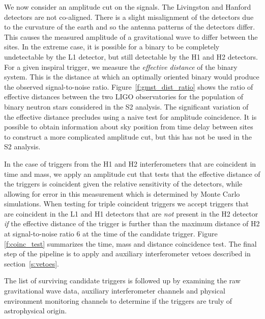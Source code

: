 We now consider an amplitude cut on the signals. The Livingston and Hanford
detectors are not co-aligned. There is a slight misalignment of the detectors
due to the curvature of the earth and so the antenna patterns of the detectors
differ. This causes the measured amplitude of a gravitational wave to differ
between the sites. In the extreme case, it is possible for a binary to be
completely undetectable by the L1 detector, but still detectable by the H1 and
H2 detectors. For a given inspiral trigger, we measure the \emph{effective
distance} of the binary system. This is the distance at which an optimally
oriented binary would produce the observed signal-to-noise ratio.
Figure~\ref{f:gmst_dist_ratio} shows the ratio of effective distances between
the two LIGO observatories for the population of binary neutron stars
considered in the S2 analysis. The significant variation of the effective
distance precludes using a naive test for amplitude coincidence. It is
possible to obtain information about sky position from time delay between
sites to construct a more complicated amplitude cut, but this has not be used
in the S2 analysis.

In the case of triggers from the H1 and H2 interferometers that are coincident
in time and mass, we apply an amplitude cut that tests that the effective
distance of the triggers is coincident given the relative sensitivity of the
detectors, while allowing for error in this measurement which is determined by
Monte Carlo simulations.  When testing for triple coincident triggers we 
accept triggers that are coincident in the L1 and H1 detectors that are
\emph{not} present in the H2 detector \emph{if} the effective distance of the
trigger is further than the maximum distance of H2 at signal-to-noise ratio
$6$ at the time of the candidate trigger. Figure \ref{f:coinc_test} summarizes
the time, mass and distance coincidence test.  The final step of the pipeline
is to apply and auxiliary interferometer vetoes described in
section~\ref{s:vetoes}. 

The list of surviving candidate triggers is followed up by examining the raw
gravitational wave data, auxiliary interferometer channels and physical
environment monitoring channels to determine if the triggers are truly of
astrophysical origin.

